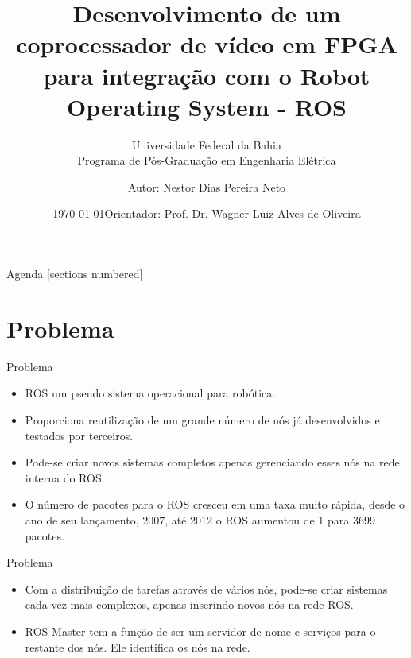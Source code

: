 \documentclass[10pt]{beamer}
\title{Desenvolvimento de um coprocessador de vídeo em FPGA para integração com o Robot Operating System - ROS}
\subtitle{Universidade Federal da Bahia\\
            Programa de Pós-Graduação em Engenharia Elétrica}
\date{\today}
\date{Orientador: Prof. Dr. Wagner Luiz Alves de Oliveira}
\author{Autor: Nestor Dias Pereira Neto}
\institute{Salvador, 3 de abril de 2019}
\begin{document}
\maketitle

\begin{frame}{Agenda}
  [sections numbered]
  \tableofcontents[hideallsubsections]
\end{frame}


\section{Problema}

{
\begin{frame}[fragile]{Problema}
    \begin{itemize}
      \item ROS um pseudo sistema operacional para robótica.
      
      \item Proporciona reutilização de um grande número de nós já desenvolvidos e testados por terceiros.
      
      \item Pode-se criar novos sistemas completos apenas gerenciando esses nós na rede interna do ROS.
      
      \item O número de pacotes para o ROS cresceu em uma taxa muito rápida, desde o ano de seu lançamento, 2007, até 2012 o ROS aumentou de 1 para 3699 pacotes.
    \end{itemize}

 \nocite{LwIP,freertosbook,ROSeffect,PDSfpga,NiosIIbook,ROSfpga}
\end{frame}
}

{
\begin{frame}[fragile]{Problema}
\begin{itemize}
    \item Com a distribuição de tarefas através de vários nós, pode-se criar sistemas cada vez mais complexos, apenas inserindo novos nós na rede ROS.
  
   \item ROS Master tem a função de ser um servidor de nome e serviços para o restante dos nós. Ele identifica os nós na rede.
\end{itemize}
  
\end{frame}
}
\end{document}
